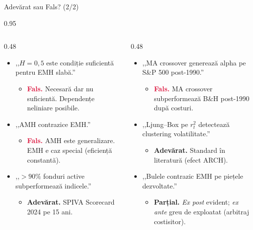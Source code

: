 \documentclass[9pt, aspectratio=169, t]{beamer}
\begin{document}
\begin{frame}[shrink=15]{Adevărat sau Fals? (2/2)}
\begin{cminipage}{0.95\textwidth}
\begin{columns}[T]
\begin{column}{0.48\textwidth}
\begin{itemize}\setlength{\itemsep}{1pt}
    \item ,,$H = 0{,}5$ este condiție suficientă pentru EMH slabă.''
    \begin{itemize}\setlength{\itemsep}{0pt}
        \item[] \textcolor{Crimson}{\textbf{Fals.}} Necesară dar nu suficientă. Dependențe neliniare posibile.
    \end{itemize}
    \item ,,AMH contrazice EMH.''
    \begin{itemize}\setlength{\itemsep}{0pt}
        \item[] \textcolor{Crimson}{\textbf{Fals.}} AMH este generalizare. EMH e caz special (eficiență constantă).
    \end{itemize}
    \item ,,$>90\%$ fonduri active subperformează indicele.''
    \begin{itemize}\setlength{\itemsep}{0pt}
        \item[] \textcolor{Forest}{\textbf{Adevărat.}} SPIVA Scorecard 2024 pe 15 ani.
    \end{itemize}
\end{itemize}
\end{column}
\begin{column}{0.48\textwidth}
\begin{itemize}\setlength{\itemsep}{1pt}
    \item ,,MA crossover generează alpha pe S\&P 500 post-1990.''
    \begin{itemize}\setlength{\itemsep}{0pt}
        \item[] \textcolor{Crimson}{\textbf{Fals.}} MA crossover subperformează B\&H post-1990 după costuri.
    \end{itemize}
    \item ,,Ljung--Box pe $r_t^2$ detectează clustering volatilitate.''
    \begin{itemize}\setlength{\itemsep}{0pt}
        \item[] \textcolor{Forest}{\textbf{Adevărat.}} Standard în literatură (efect ARCH).
    \end{itemize}
    \item ,,Bulele contrazic EMH pe piețele dezvoltate.''
    \begin{itemize}\setlength{\itemsep}{0pt}
        \item[] \textcolor{Amber}{\textbf{Parțial.}} \emph{Ex post} evident; \emph{ex ante} greu de exploatat (arbitraj costisitor).
    \end{itemize}
\end{itemize}
\end{column}
\end{columns}
\end{cminipage}
\end{frame}
\end{document}
